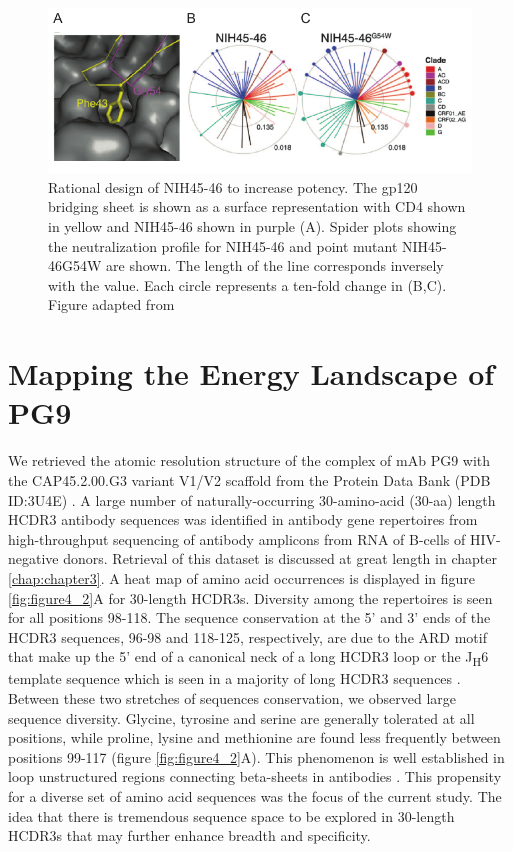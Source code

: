 \begin{figure}
   \centering
   \includegraphics{images/chapter4/figure4_1.pdf} %
   \caption[Rational Design of NIH45-46 to Increase Potency]{Rational design of NIH45-46 to increase potency. The gp120 bridging sheet is shown as a surface representation with CD4 shown in yellow and NIH45-46 shown in purple (A). Spider plots showing the neutralization profile for NIH45-46 and point mutant NIH45-46G54W are shown. The length of the line corresponds inversely with the \ic value. Each circle represents a ten-fold change in \ic (B,C). Figure adapted from \citep{Diskin:2011hl}}
   \label{fig:figure4_1}
\end{figure}

\section{Mapping the Energy Landscape of PG9}
\label{sec:mapping}
We retrieved the atomic resolution structure of the complex of mAb PG9 with the CAP45.2.00.G3 variant V1/V2 scaffold from the Protein Data Bank (PDB ID:3U4E) \citep{McLellan:2011dg}. A large number of naturally-occurring 30-amino-acid (30-aa) length HCDR3 antibody sequences was identified in antibody gene repertoires from high-throughput sequencing of antibody amplicons from RNA of B-cells of HIV-negative donors. Retrieval of this dataset is discussed at great length in chapter \ref{chap:chapter3}. A heat map of amino acid occurrences is displayed in figure \ref{fig:figure4_2}A for 30-length HCDR3s. Diversity among the repertoires is seen for all positions 98-118. The sequence conservation at the 5' and 3' ends of the HCDR3 sequences, 96-98 and 118-125, respectively, are due to the ARD motif that make up the 5' end of a canonical neck of a long HCDR3 loop or the J\textsubscript{H}6 template sequence which is seen in a majority of long HCDR3 sequences \citep{North:2011dv,Briney:2012ib}. Between these two stretches of sequences conservation, we observed large sequence diversity. Glycine, tyrosine and serine are generally tolerated at all positions, while proline, lysine and methionine are found less frequently between positions 99-117 (figure \ref{fig:figure4_2}A). This phenomenon is well established in loop unstructured regions connecting beta-sheets in antibodies \citep{Minuchehr:2005wc,De:2005in}.  This propensity for a diverse set of amino acid sequences was the focus of the current study. The idea that there is tremendous sequence space to be explored in 30-length HCDR3s that may further enhance breadth and specificity.

